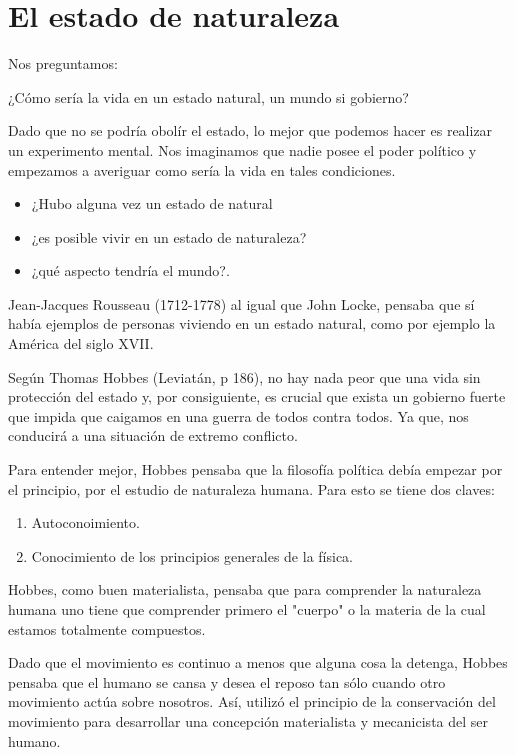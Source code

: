 \chapter{El estado de naturaleza}

Nos preguntamos:

\begin{center}
    ¿Cómo sería la vida en un estado natural, un mundo si gobierno?
\end{center}

Dado que no se podría obolír el estado, lo mejor que podemos hacer es realizar un experimento mental. Nos imaginamos que nadie posee el poder político y empezamos a averiguar como sería la vida en tales condiciones.

\begin{itemize}
    \item ¿Hubo alguna vez un estado de natural
    \item ¿es posible vivir en un estado de naturaleza? 
    \item ¿qué aspecto tendría el mundo?.
\end{itemize}

Jean-Jacques Rousseau (1712-1778) al igual que John Locke, pensaba que sí había ejemplos de personas viviendo en un estado natural, como por ejemplo la América del siglo XVII.

Según Thomas Hobbes (Leviatán, p 186), no hay nada peor que una vida sin protección del estado y, por consiguiente, es crucial que exista un gobierno fuerte que impida que caigamos en una guerra de todos contra todos. Ya que, nos conducirá a una situación de extremo conflicto.

Para entender mejor, Hobbes pensaba que la filosofía política debía empezar por el principio, por el estudio de naturaleza humana. Para esto se tiene dos claves:

\begin{enumerate}
    \item Autoconoimiento.
    \item Conocimiento de los principios generales de la física.
\end{enumerate}

Hobbes, como buen materialista, pensaba que para comprender la naturaleza humana uno tiene que comprender primero el "cuerpo" o la materia de la cual estamos totalmente compuestos.

Dado que el movimiento es continuo a menos que alguna cosa la detenga, Hobbes pensaba que el humano se cansa y desea el reposo tan sólo cuando otro movimiento actúa sobre nosotros. Así, utilizó el principio de la conservación del movimiento para desarrollar una concepción materialista y mecanicista del ser humano.
